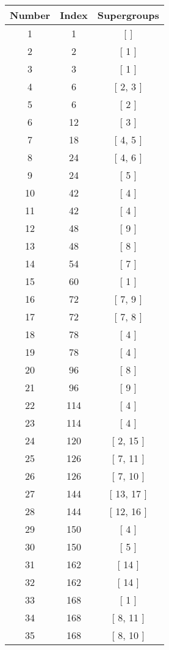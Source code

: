 \begin{center}
\begin{longtable}[H]{|| c c c ||}
\hline
Number & Index & Supergroups \\ 
\hline
1 & 1 & [  ] \\ 
\hline
2 & 2 & [ 1 ] \\ 
\hline
3 & 3 & [ 1 ] \\ 
\hline
4 & 6 & [ 2, 3 ] \\ 
\hline
5 & 6 & [ 2 ] \\ 
\hline
6 & 12 & [ 3 ] \\ 
\hline
7 & 18 & [ 4, 5 ] \\ 
\hline
8 & 24 & [ 4, 6 ] \\ 
\hline
9 & 24 & [ 5 ] \\ 
\hline
10 & 42 & [ 4 ] \\ 
\hline
11 & 42 & [ 4 ] \\ 
\hline
12 & 48 & [ 9 ] \\ 
\hline
13 & 48 & [ 8 ] \\ 
\hline
14 & 54 & [ 7 ] \\ 
\hline
15 & 60 & [ 1 ] \\ 
\hline
16 & 72 & [ 7, 9 ] \\ 
\hline
17 & 72 & [ 7, 8 ] \\ 
\hline
18 & 78 & [ 4 ] \\ 
\hline
19 & 78 & [ 4 ] \\ 
\hline
20 & 96 & [ 8 ] \\ 
\hline
21 & 96 & [ 9 ] \\ 
\hline
22 & 114 & [ 4 ] \\ 
\hline
23 & 114 & [ 4 ] \\ 
\hline
24 & 120 & [ 2, 15 ] \\ 
\hline
25 & 126 & [ 7, 11 ] \\ 
\hline
26 & 126 & [ 7, 10 ] \\ 
\hline
27 & 144 & [ 13, 17 ] \\ 
\hline
28 & 144 & [ 12, 16 ] \\ 
\hline
29 & 150 & [ 4 ] \\ 
\hline
30 & 150 & [ 5 ] \\ 
\hline
31 & 162 & [ 14 ] \\ 
\hline
32 & 162 & [ 14 ] \\ 
\hline
33 & 168 & [ 1 ] \\ 
\hline
34 & 168 & [ 8, 11 ] \\ 
\hline
35 & 168 & [ 8, 10 ] \\ 

\end{longtable}
\end{center}
